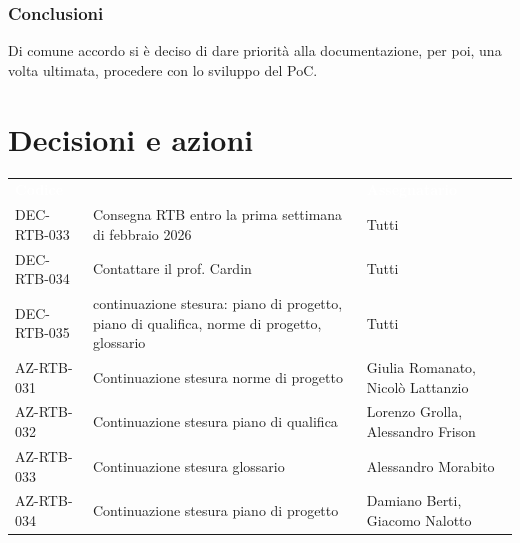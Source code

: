 \documentclass[a4paper, 11pt]{article}
\begin{document}
\subsubsection{Conclusioni}
Di comune accordo si è deciso di dare priorità alla documentazione, per poi, una volta ultimata, procedere con lo sviluppo del PoC.\\

\section{Decisioni e azioni} \label{DecisioniAzioni}
\begin{center}
    \begin{tabular}{>{\centering\arraybackslash}m{3cm} >{\raggedright\arraybackslash}p{7cm} >{\centering\arraybackslash}p{2.5cm}}
        \rowcolor{AccentColor}
        \textcolor{white}{\textbf{Codice }} & 
        \multicolumn{1}{c}{\textcolor{white}{\textbf{Descrizione}}} & 
        \textcolor{white}{\textbf{Assegnatario}} \\
        
        DEC-RTB-033 & Consegna RTB entro la prima settimana di febbraio 2026 & Tutti \\
        DEC-RTB-034 & Contattare il prof. Cardin & Tutti \\
        DEC-RTB-035 & continuazione stesura: piano di progetto, piano di qualifica, norme di progetto, glossario & Tutti \\
        \midrule
        AZ-RTB-031 & Continuazione stesura norme di progetto & Giulia Romanato, Nicolò Lattanzio\\
        AZ-RTB-032 & Continuazione stesura piano di qualifica & Lorenzo Grolla, Alessandro Frison\\
        AZ-RTB-033 & Continuazione stesura glossario & Alessandro Morabito\\
        AZ-RTB-034 & Continuazione stesura piano di progetto & Damiano Berti, Giacomo Nalotto\\
    \end{tabular}
\end{center}
\end{document}
